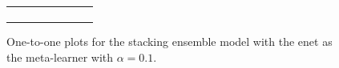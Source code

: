 \begin{figure}
{\begin{tabular}{cc}
\begin{subfigure}{0.5\textwidth}
            \end{subfigure}
        \end{tabular}
    }
    \caption{One-to-one plots for the stacking ensemble model with the \gls{enet} as the meta-learner with $\alpha = 0.1$.}
    \label{fig:enetalpha01_one_to_one}
\end{figure}

\begin{figure}
    \centering
\end{figure}
